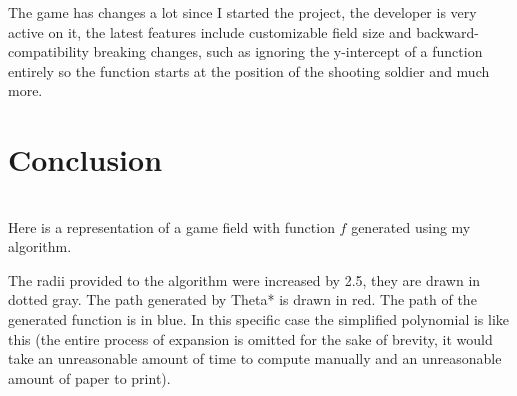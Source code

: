 \documentclass[12pt, titlepage]{article}
\begin{document}
The game has changes a lot since I started the project, the developer 
is very active on it, the latest features include customizable 
field size and backward-compatibility breaking changes, such as ignoring the 
y-intercept of a function entirely so the function starts at the position
of the shooting soldier and much more.

\section{Conclusion}

\begin{center}
\\
Here is a representation of a game field with function $f$ generated using my
algorithm. 
\end{center}

The radii provided to the algorithm were increased by 2.5,
they are drawn in dotted gray. The path generated by Theta* is drawn in red.
The path of the generated function is in blue. In this specific case
the simplified polynomial is like this (the entire process of expansion
is omitted for the sake of brevity, it would take an unreasonable amount 
of time to compute manually and an unreasonable amount of paper to print).

\newcommand\smalldots{\makebox[0.75em][c]{.\hfil.\hfil.}}
\end{document}
